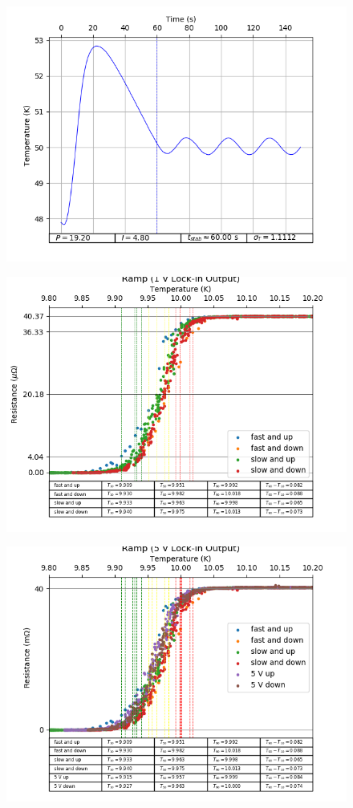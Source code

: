 \documentclass[8pt, a4paper]{article}
\begin{document}
\begin{figure}[h!]
\includegraphics{50Kpi.png}
\end{figure}

\begin{figure}[h!]
\includegraphics{superc.png}
\end{figure}

\begin{figure}[h!]
\includegraphics{superchl.png}
\end{figure}
\end{document}
